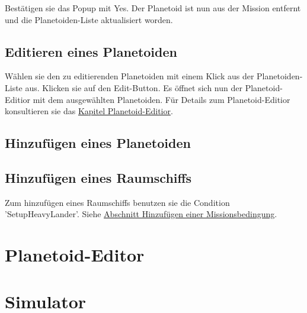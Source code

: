 Bestätigen sie das Popup mit Yes.
Der Planetoid ist nun aus der Mission entfernt und die Planetoiden-Liste aktualisiert worden.

\subsection{Editieren eines Planetoiden}
Wählen sie den zu editierenden Planetoiden mit einem Klick aus der Planetoiden-Liste aus.
Klicken sie auf den Edit-Button.
Es öffnet sich nun der Planetoid-Editior mit dem ausgewählten Planetoiden.
Für Details zum Planetoid-Editior konsultieren sie das \hyperlink{planetoideditor}{Kapitel Planetoid-Editior}.

\subsection{Hinzufügen eines Planetoiden}
\unimplemented

\subsection{Hinzufügen eines Raumschiffs}
Zum hinzufügen eines Raumschiffs benutzen sie die Condition 'SetupHeavyLander'.
Siehe \hyperlink{addcondition}{Abschnitt Hinzufügen einer Missionsbedingung}.

\hypertarget{planetoideditor}{\section{Planetoid-Editor}}

\hypertarget{simulator}{\section{Simulator}}